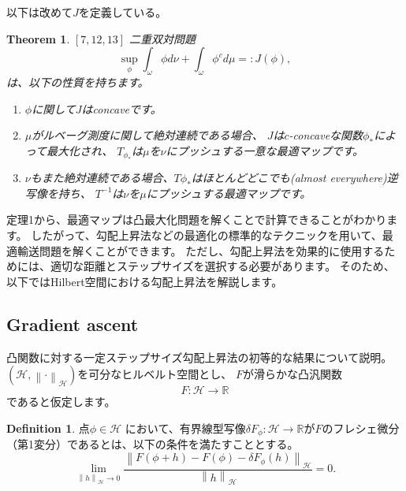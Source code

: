 \documentclass{jsarticle}
\newtheorem{thm}{Theorem}[section]
\theoremstyle{definition}
\newtheorem{dfn}{Definition}[section]
\begin{document}
以下は改めて$J$を定義している。
\begin{thm}
  $\left[ 7,12,13 \right]$ 
  二重双対問題
  \begin{equation*}
    \sup_\phi \int_\omega \phi  d \nu + \int_\omega \phi^c  d \mu =: J(\phi),
  \end{equation*}
  は、以下の性質を持ちます。

  \begin{enumerate}
    \item $\phi$に関して$J$はconcaveです。
    
    \item $\mu$がルベーグ測度に関して絶対連続である場合、
    $J$は$c$-concaveな関数$\phi_*$によって最大化され、
    $T_{\phi_*}$は$\mu$を$\nu$にプッシュする一意な最適マップです。
    
    \item $\nu$もまた絶対連続である場合、$T\phi_*$はほとんどどこでも(almost everywhere)逆写像を持ち、
    $T^{-1}$は$\nu$を$\mu$にプッシュする最適マップです。
  \end{enumerate}
\end{thm}

定理1から、最適マップは凸最大化問題を解くことで計算できることがわかります。
したがって、勾配上昇法などの最適化の標準的なテクニックを用いて、最適輸送問題を解くことができます。
ただし、{\color{red}勾配上昇法を効果的に使用するためには、適切な距離とステップサイズを選択する必要があります。}
そのため、以下ではHilbert空間における勾配上昇法を解説します。

\subsection{Gradient ascent}
凸関数に対する一定ステップサイズ勾配上昇法の初等的な結果について説明。
$(\mathcal{H} , \left\lVert \cdot  \right\rVert_\mathcal{H})$を可分なヒルベルト空間とし、 $F$が滑らかな凸汎関数
\begin{equation*}
  F: \mathcal{H} \to \mathbb{R}
\end{equation*}
であると仮定します。

\begin{dfn}
  点$\phi \in \mathcal{H}$ において、有界線型写像$\delta F_\phi: \mathcal{H} \to \mathbb{R}$が$F$のフレシェ微分（第1変分）であるとは、以下の条件を満たすこととする。
  \begin{equation*}
    \lim_{\left\lVert h \right\rVert_{\mathcal{H}} \to 0} \frac{\left\lVert F(\phi + h) - F(\phi) - \delta F_\phi (h) \right\rVert_{\mathcal{H}}}{\left\lVert h \right\rVert_{\mathcal{H}}} = 0.
  \end{equation*}
\end{dfn}
\end{document}
